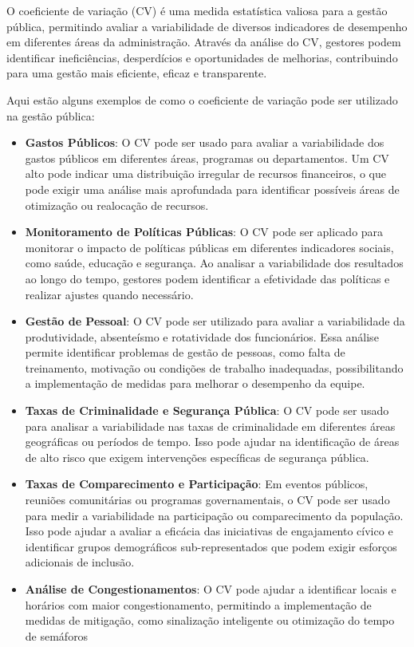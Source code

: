 O coeficiente de variação (CV) é uma medida estatística valiosa para a gestão pública, permitindo avaliar a variabilidade de diversos indicadores de desempenho em diferentes áreas da administração. Através da análise do CV, gestores podem identificar ineficiências, desperdícios e oportunidades de melhorias, contribuindo para uma gestão mais eficiente, eficaz e transparente.\vskip0.3cm

Aqui estão alguns exemplos de como o coeficiente de variação pode ser utilizado na gestão pública:

\begin{itemize}
    \item \textbf{Gastos Públicos}: O CV pode ser usado para avaliar a variabilidade dos gastos públicos em diferentes áreas, programas ou departamentos. Um CV alto pode indicar uma distribuição irregular de recursos financeiros, o que pode exigir uma análise mais aprofundada para identificar possíveis áreas de otimização ou realocação de recursos.

    \newpage
    \item \textbf{Monitoramento de Políticas Públicas}: O CV pode ser aplicado para monitorar o impacto de políticas públicas em diferentes indicadores sociais, como saúde, educação e segurança. Ao analisar a variabilidade dos resultados ao longo do tempo, gestores podem identificar a efetividade das políticas e realizar ajustes quando necessário.
    \item \textbf{Gestão de Pessoal}: O CV pode ser utilizado para avaliar a variabilidade da produtividade, absenteísmo e rotatividade dos funcionários. Essa análise permite identificar problemas de gestão de pessoas, como falta de treinamento, motivação ou condições de trabalho inadequadas, possibilitando a implementação de medidas para melhorar o desempenho da equipe.
    \item \textbf{Taxas de Criminalidade e Segurança Pública}: O CV pode ser usado para analisar a variabilidade nas taxas de criminalidade em diferentes áreas geográficas ou períodos de tempo. Isso pode ajudar na identificação de áreas de alto risco que exigem intervenções específicas de segurança pública.
    \item \textbf{Taxas de Comparecimento e Participação}: Em eventos públicos, reuniões comunitárias ou programas governamentais, o CV pode ser usado para medir a variabilidade na participação ou comparecimento da população. Isso pode ajudar a avaliar a eficácia das iniciativas de engajamento cívico e identificar grupos demográficos sub-representados que podem exigir esforços adicionais de inclusão.
    \item \textbf{Análise de Congestionamentos}: O CV pode ajudar a identificar locais e horários com maior congestionamento, permitindo a implementação de medidas de mitigação, como sinalização inteligente ou otimização do tempo de semáforos 
\end{itemize}

